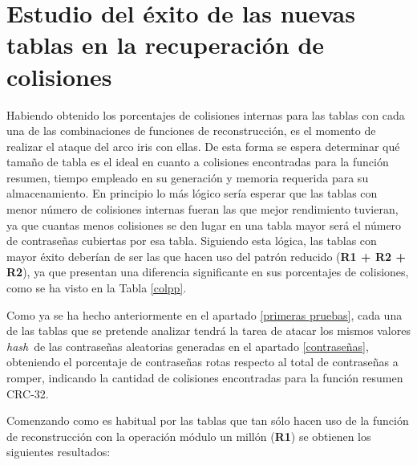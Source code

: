 \documentclass[12pt,spanish,listoffigures,listoftables,listofalgorithms]{tfgetsinf}
\newcommand{\hash}{\textit{hash}}
\begin{document}
\section{Estudio del éxito de las nuevas tablas en la recuperación de colisiones}

Habiendo obtenido los porcentajes de colisiones internas para las tablas con cada una de las combinaciones de funciones de reconstrucción, es el momento de realizar el ataque del arco iris con ellas. De esta forma se espera determinar qué tamaño de tabla es el ideal en cuanto a colisiones encontradas para la función resumen, tiempo empleado en su generación y memoria requerida para su almacenamiento. En principio lo más lógico sería esperar que las tablas con menor número de colisiones internas fueran las que mejor rendimiento tuvieran, ya que cuantas menos colisiones se den lugar en una tabla mayor será el número de contraseñas cubiertas por esa tabla. Siguiendo esta lógica, las tablas con mayor éxito deberían de ser las que hacen uso del patrón reducido (\textbf{R1 + R2 + R2}), ya que presentan una diferencia significante en sus porcentajes de colisiones, como se ha visto en la Tabla \ref{colpp}.

Como ya se ha hecho anteriormente en el apartado \ref{primeras pruebas}, cada una de las tablas que se pretende analizar tendrá la tarea de atacar los mismos valores \hash~de las contraseñas aleatorias generadas en el apartado \ref{contraseñas}, obteniendo el porcentaje de contraseñas rotas respecto al total de contraseñas a romper, indicando la cantidad de colisiones encontradas para la función resumen CRC-32.

Comenzando como es habitual por las tablas que tan sólo hacen uso de la función de reconstrucción con la operación módulo un millón (\textbf{R1}) se obtienen los siguientes resultados:
\end{document}
